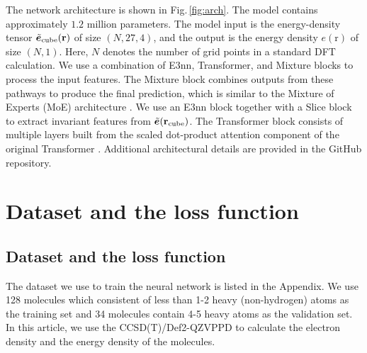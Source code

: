 \documentclass[%
twocolumn,
amsmath,
amssymb,
groupedaddress,
reprint,%
]{revtex4-2}
\newcommand{\Fig}[1]{Fig.\,\ref{#1}}
\newcommand{\brm}[1]{\bm{\mathrm{#1}}}
\begin{document}
The network architecture is shown in \Fig{fig:arch}.
% 
The model contains approximately $1.2$ million parameters.
%
The model input is the energy-density tensor ${\tilde{\bm{e}}_{\rm{cube}}(\brm{r})}$ of size $(N, 27, 4)$, and the output is the energy density ${e(\brm{r})}$ of size $(N, 1)$.
% 
Here, $N$ denotes the number of grid points in a standard DFT calculation.
% 
We use a combination of E3nn, Transformer, and Mixture blocks to process the input features.
% 
The Mixture block combines outputs from these pathways to produce the final prediction, which is similar to the Mixture of Experts (MoE) architecture \cite{caiSurveyMixtureExperts2025}.
% 
We use an E3nn block \cite{geigerE3nnEuclideanNeural2022-07-18} together with a Slice block to extract invariant features from $\tilde{\bm{e}}(\brm{r}_{\rm{cube}})$.
%
The Transformer block consists of multiple layers built from the scaled dot-product attention component of the original Transformer \cite{vaswaniAttentionAllYou2023-08-02}.
%
Additional architectural details are provided in the GitHub repository\cite{TODO:}.



\section{Dataset and the loss function}
\subsection{Dataset and the loss function}
The dataset we use to train the neural network is listed in the Appendix.
%
We use 128 molecules which consistent of less than 1-2 heavy (non-hydrogen) atoms as the training set and 34 molecules contain 4-5 heavy atoms as the validation set.
% 
In this article, we use the CCSD(T)/Def2-QZVPPD \cite{bartlettCoupledclusterTheoryQuantum2007-02-22,weigendBalancedBasisSets2005,zhengMinimallyAugmentedKarlsruhe2011-02} to calculate the electron density and the energy density of the molecules.
\end{document}
